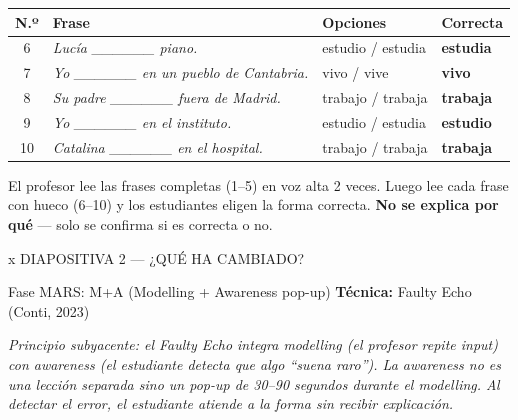 \documentclass[a4paper,10pt]{article}
\renewcommand{\arraystretch}{1.3}
\begin{document}
\renewcommand{\arraystretch}{1.5}
\begin{tabularx}{\textwidth}{c X >{\centering\arraybackslash}p{3.5cm} >{\centering\arraybackslash}p{2cm}}
\textbf{N.º} & \textbf{Frase} & \textbf{Opciones} & \textbf{Correcta} \\
\midrule
6 & \textit{Lucía \_\_\_\_\_\_ piano.} & estudio / estudia & \textbf{estudia} \\
7 & \textit{Yo \_\_\_\_\_\_ en un pueblo de Cantabria.} & vivo / vive & \textbf{vivo} \\
8 & \textit{Su padre \_\_\_\_\_\_ fuera de Madrid.} & trabajo / trabaja & \textbf{trabaja} \\
9 & \textit{Yo \_\_\_\_\_\_ en el instituto.} & estudio / estudia & \textbf{estudio} \\
10 & \textit{Catalina \_\_\_\_\_\_ en el hospital.} & trabajo / trabaja & \textbf{trabaja} \\
\end{tabularx}

\vspace{0.4cm}

\begin{notabox}
{\small El profesor lee las frases completas (1--5) en voz alta 2 veces. Luego lee cada frase con hueco (6--10) y los estudiantes eligen la forma correcta. \textbf{No se explica por qué} — solo se confirma si es correcta o no.}
\end{notabox}

\newpage


\begin{diapheader}{x}
DIAPOSITIVA 2 — ¿QUÉ HA CAMBIADO?
\end{diapheader}

\vspace{0.3cm}

\begin{marsbox}{Fase MARS: M+A (Modelling + Awareness pop-up)}
\textbf{Técnica:} Faulty Echo (Conti, 2023)
\end{marsbox}

\vspace{0.2cm}

{\small\textit{Principio subyacente: el Faulty Echo integra modelling (el profesor repite input) con awareness (el estudiante detecta que algo ``suena raro''). La awareness no es una lección separada sino un pop-up de 30--90 segundos durante el modelling. Al detectar el error, el estudiante atiende a la forma sin recibir explicación.}}
\end{document}
